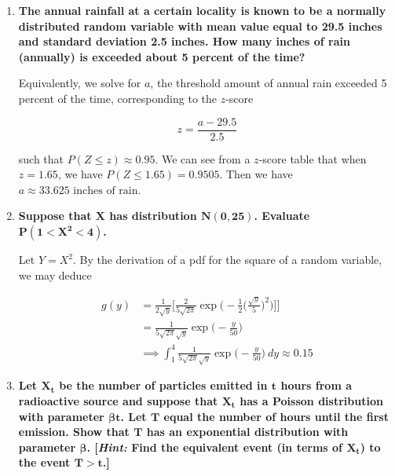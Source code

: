 \documentclass[10pt, oneside]{article}
\begin{document}
\begin{enumerate}[label=9.\arabic*]
\item  \begin{tcolorbox}[
  colback=Cerulean!5!white,
  colframe=Cerulean!75!black]
\textbf{The annual rainfall at a certain locality is known to be a normally distributed random variable with mean value equal to 29.5 inches and standard deviation 2.5 inches. How many inches of rain (annually) is exceeded about 5 percent of the time?}
\end{tcolorbox}

Equivalently, we solve for $a$, the threshold amount of annual rain exceeded 5 percent of the time, corresponding to the $z$-score

\[ z = \frac{a - 29.5}{2.5} \]

such that $P(Z \leq z) \approx 0.95$. We can see from a $z$-score table that when $z = 1.65$, we have $P(Z \leq 1.65) = 0.9505$. Then we have $\boxed{ a \approx 33.625 \text{ inches of rain}}$.

\item  \begin{tcolorbox}[
  colback=Cerulean!5!white,
  colframe=Cerulean!75!black]
\textbf{Suppose that $\bm{X}$ has distribution $\bm{N(0,25)}$. Evaluate $\bm{P(1 < X^2 < 4)}$.}
\end{tcolorbox}

Let $Y = X^2$. By the derivation of a pdf for the square of a random variable, we may deduce

\begin{align*}
g(y) &= \frac{1}{2\sqrt{y}} \bigg[ \frac{2}{5\sqrt{2\pi}} \exp \bigg( -\frac{1}{2} \bigg( \frac{\sqrt{y}}{5} \bigg)^2 \bigg) \bigg] \bigg] \\
&= \frac{1}{5 \sqrt{2\pi} \sqrt{y}} \exp \bigg( -\frac{y}{50} \bigg) \\
&\implies \int^4_1 \frac{1}{5 \sqrt{2\pi} \sqrt{y}} \exp \bigg( -\frac{y}{50} \bigg) \ dy \approx \boxed{0.15}
\end{align*}

\newpage
\item  \begin{tcolorbox}[
  colback=Cerulean!5!white,
  colframe=Cerulean!75!black]
\textbf{Let $\bm{X_t}$ be the number of particles emitted in $\bm{t}$ hours from a radioactive source and suppose that $\bm{X_t}$ has a Poisson distribution with parameter $\bm{\beta t}$. Let $\bm{T}$ equal the number of hours until the first emission. Show that $\bm{T}$ has an exponential distribution with parameter $\bm{\beta}$. [\textit{Hint:} Find the equivalent event (in terms of $\bm{X_t}$) to the event $\bm{T > t}$.]}
\end{tcolorbox}


\end{enumerate}
\end{document}
